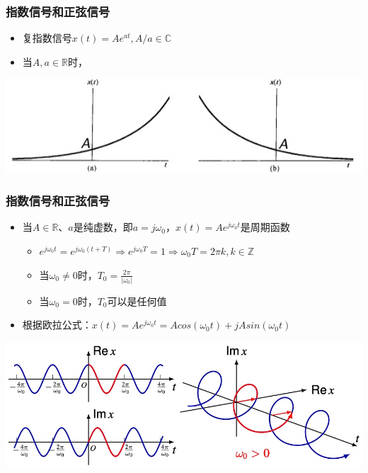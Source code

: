 \documentclass[CJKutf8,dvipsnames,table]{beamer}
\begin{document}
\begin{CJK*}{UTF8}{song}
  \begin{frame}
    \frametitle{指数信号和正弦信号}
    \begin{itemize}
    \item 复指数信号$x(t)=Ae^{at}, A/a \in \mathbb{C}$
    \item 当$A, a \in \mathbb{R}$时，
    \end{itemize}
    \begin{center}
      \includegraphics[scale=.4]{cexp}
    \end{center}  
  \end{frame}  
  
  \begin{frame}
    \frametitle{指数信号和正弦信号}
    \begin{itemize}
    \item 当$A \in \mathbb{R}$、$a$是纯虚数，即$a=j\omega_0$，$x(t)=Ae^{j\omega_{0}t}$是周期函数
    \begin{itemize}
    \item $e^{j\omega_{0}t}=e^{j\omega_{0}(t+T)} \Rightarrow e^{j\omega_{0}T}=1 \Rightarrow \omega_0 T=2\pi k, k \in \mathbb{Z}$
    \item 当$\omega_0 \neq 0$时，$T_0=\frac{2\pi}{|\omega_0|}$
    \item 当$\omega_0=0$时，$T_0$可以是任何值
    \end{itemize}
    \item 根据欧拉公式：$x(t)=Ae^{j\omega_0 t}=Acos(\omega_0 t)+jAsin(\omega_0 t)$
    \end{itemize}
    \begin{center}
      \includegraphics[scale=.4]{csinusoid}
    \end{center}     
  \end{frame}    


\end{CJK*}
\end{document}
